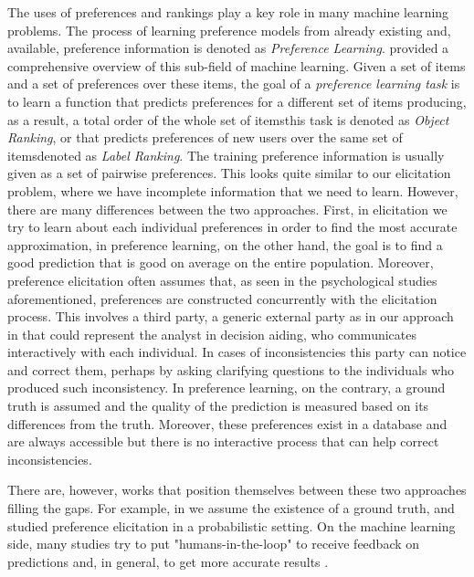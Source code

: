 The uses of preferences and rankings play a key role in many machine learning problems. The process of learning preference models from already existing and, available, preference information is denoted as \textit{Preference Learning}. \citet{Furnkranz2010} provided a comprehensive overview of this sub-field of machine learning.
Given a set of items and a set of preferences over these items, the goal of a \textit{preference learning task} is to learn a function that predicts preferences for a different set of items producing, as a result, a total order of the whole set of items\textemdash this task is denoted as \textit{Object Ranking}\textemdash, or that predicts preferences of new users over the same set of items\textemdash denoted as \textit{Label Ranking}.
The training preference information is usually given as a set of pairwise preferences.
This looks quite similar to our elicitation problem, where we have incomplete information that we need to learn. However, there are many differences between the two approaches.
First, in elicitation we try to learn about each individual preferences in order to find the most accurate approximation, in preference learning, on the other hand, the goal is to find a good prediction that is good on average on the entire population. Moreover, preference elicitation often assumes that, as seen in the psychological studies aforementioned, preferences are constructed concurrently with the elicitation process. This involves a third party, a generic external party as in our approach in  that could represent the analyst in decision aiding, who communicates interactively with each individual. In cases of inconsistencies this party can notice and correct them, perhaps by asking clarifying questions to the individuals who produced such inconsistency.
In preference learning, on the contrary, a ground truth is assumed and the quality of the prediction is measured based on its differences from the truth. Moreover, these preferences exist in a database and are always accessible but there is no interactive process that can help correct inconsistencies.

There are, however, works that position themselves between these two approaches filling the gaps. For example, in  we assume the existence of a ground truth, and \citet{Bachrach2010,Lu2011Prob} studied preference elicitation in a probabilistic setting. On the machine learning side, many studies try to put "humans-in-the-loop" to receive feedback on predictions and, in general, to get more accurate results \citep{Wu2022}.




